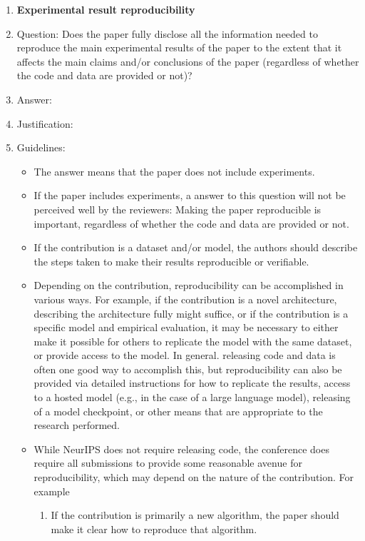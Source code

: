 \documentclass{article}
\begin{document}
\begin{enumerate}
    \item {\bf Experimental result reproducibility}
    \item[] Question: Does the paper fully disclose all the information needed to reproduce the main experimental results of the paper to the extent that it affects the main claims and/or conclusions of the paper (regardless of whether the code and data are provided or not)?
    \item[] Answer: \answerTODO{} %
    \item[] Justification: \justificationTODO{}
    \item[] Guidelines:
    \begin{itemize}
        \item The answer \answerNA{} means that the paper does not include experiments.
        \item If the paper includes experiments, a \answerNo{} answer to this question will not be perceived well by the reviewers: Making the paper reproducible is important, regardless of whether the code and data are provided or not.
        \item If the contribution is a dataset and\slash or model, the authors should describe the steps taken to make their results reproducible or verifiable. 
        \item Depending on the contribution, reproducibility can be accomplished in various ways. For example, if the contribution is a novel architecture, describing the architecture fully might suffice, or if the contribution is a specific model and empirical evaluation, it may be necessary to either make it possible for others to replicate the model with the same dataset, or provide access to the model. In general. releasing code and data is often one good way to accomplish this, but reproducibility can also be provided via detailed instructions for how to replicate the results, access to a hosted model (e.g., in the case of a large language model), releasing of a model checkpoint, or other means that are appropriate to the research performed.
        \item While NeurIPS does not require releasing code, the conference does require all submissions to provide some reasonable avenue for reproducibility, which may depend on the nature of the contribution. For example
        \begin{enumerate}
            \item If the contribution is primarily a new algorithm, the paper should make it clear how to reproduce that algorithm.

\end{enumerate}
\end{itemize}
\end{enumerate}
\end{document}
